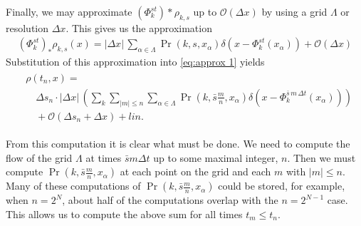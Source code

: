 \documentclass[12pt]{amsart}
\begin{document}
Finally, we may approximate $(\Phi_k^{st})*\rho_{k,s}$ up to $\mathcal{O}( \Delta x)$ by using a grid $\Lambda$ or resolution $\Delta x$.
This gives us the approximation
\begin{align*}
	(\Phi_k^{st})_* \rho_{k,s}(x) = |\Delta x |\, \sum_{\alpha \in \Lambda } \Pr( k , s , x_\alpha) \delta( x - \Phi_k^{st} (x_\alpha) ) + \mathcal{O}( \Delta x )
\end{align*}
Substitution of this approximation into \eqref{eq:approx 1} yields 
\begin{align}
\begin{split}
	&\rho(t_n , x) = \\
	&\quad \Delta s_n \cdot | \Delta x| \, \left( \sum_{k} \sum_{ |m| \leq n }  \sum_{\alpha \in \Lambda } \Pr( k , \bar{s}\frac{m}{n} , x_\alpha) \delta( x - \Phi_k^{\bar{s}\, m \, \Delta t} (x_\alpha) ) \right) \\
	&\quad +\mathcal{O}( \Delta s_n + \Delta x) + lin. \label{eq:approx 2}
\end{split}
\end{align}

From this computation it is clear what must be done.
We need to compute the flow of the grid $\Lambda$ at times $\bar{s} m \Delta t$ up to some maximal integer, $n$.
Then we must compute $\Pr( k , \bar{s}\frac{m}{n} , x_\alpha)$ at each point on the grid and each $m$ with $|m| \leq n$.
Many of these computations of $\Pr(k,\bar{s} \frac{m}{n}, x_\alpha)$ could be stored, for example, when $n=2^{N}$, about half of the computations overlap with the $n=2^{N-1}$ case.
This allows us to compute the above sum for all times $t_m \leq t_n$.
\end{document}
